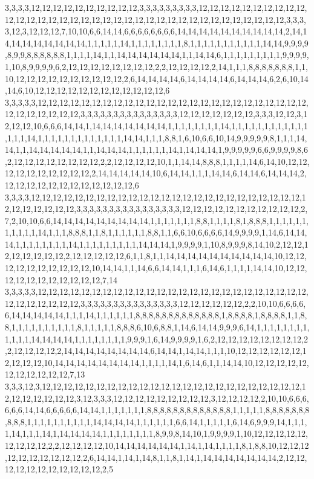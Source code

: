 3,3,3,3,12,12,12,12,12,12,12,12,12,12,3,3,3,3,3,3,3,3,3,12,12,12,12,12,12,12,12,12,12,12,12,12,12,12,12,12,12,12,12,12,12,12,12,12,12,12,12,12,12,12,12,12,12,12,12,3,3,3,3,12,3,12,12,12,7,10,10,6,6,14,14,6,6,6,6,6,6,6,6,14,14,14,14,14,14,14,14,14,14,2,14,14,14,14,14,14,14,14,14,1,1,1,1,1,14,1,1,1,1,1,1,1,1,8,1,1,1,1,1,1,1,1,1,1,1,14,14,9,9,9,9,8,9,9,8,8,8,8,8,8,1,1,1,1,14,1,1,14,14,14,14,14,14,1,1,14,14,6,1,1,1,1,1,1,1,1,1,9,9,9,9,1,10,8,9,9,9,9,6,2,12,12,12,12,12,12,12,12,2,2,12,12,12,12,2,14,1,1,1,8,8,8,8,8,8,8,1,1,10,12,12,12,12,12,12,12,12,12,12,2,6,14,14,14,14,6,14,14,14,14,6,14,14,14,6,2,6,10,14,14,6,10,12,12,12,12,12,12,12,12,12,12,12,12,6
3,3,3,3,3,12,12,12,12,12,12,12,12,12,12,12,12,12,12,12,12,12,12,12,12,12,12,12,12,12,12,12,12,12,12,12,12,3,3,3,3,3,3,3,3,3,3,3,3,3,3,3,12,12,12,12,12,12,12,3,3,3,12,12,3,12,12,12,10,6,6,6,14,14,1,14,14,14,14,14,14,14,1,1,1,1,1,1,1,1,14,1,1,1,1,1,1,1,1,1,1,1,1,1,1,1,14,1,1,1,1,1,1,1,1,1,1,1,1,1,14,14,1,1,1,8,8,1,6,10,6,6,10,14,9,9,9,9,9,8,1,1,1,14,14,1,1,14,14,14,14,14,1,1,14,14,14,1,1,1,1,1,1,14,1,14,14,14,1,9,9,9,9,9,6,6,9,9,9,9,8,6,2,12,12,12,12,12,12,12,12,2,2,12,12,12,12,10,1,1,14,14,8,8,8,1,1,1,1,14,6,14,10,12,12,12,12,12,12,12,12,12,12,2,14,14,14,14,14,10,6,14,14,1,1,1,14,14,6,14,14,6,14,14,14,2,12,12,12,12,12,12,12,12,12,12,12,12,6
3,3,3,3,12,12,12,12,12,12,12,12,12,12,12,12,12,12,12,12,12,12,12,12,12,12,12,12,12,12,12,12,12,12,12,12,3,3,3,3,3,3,3,3,3,3,3,3,3,3,3,3,12,12,12,12,12,12,12,12,12,12,12,2,7,2,10,10,6,6,14,14,14,14,14,14,14,14,14,1,1,1,1,1,1,1,8,8,1,1,1,1,8,1,8,8,8,1,1,1,1,1,1,1,1,1,1,1,14,1,1,1,8,8,8,1,1,8,1,1,1,1,1,1,8,8,1,1,6,6,10,6,6,6,6,14,9,9,9,9,1,14,6,14,14,14,1,1,1,1,1,1,1,1,14,1,1,1,1,1,1,1,1,1,14,14,14,1,9,9,9,9,1,10,8,9,9,9,8,14,10,2,12,12,12,12,12,12,12,12,2,12,12,12,12,12,6,1,1,8,1,1,14,14,14,14,14,14,14,14,14,14,10,12,12,12,12,12,12,12,12,12,12,10,14,14,1,1,14,6,6,14,14,1,1,1,6,14,6,1,1,1,1,14,14,10,12,12,12,12,12,12,12,12,12,12,12,7,14
3,3,3,3,3,12,12,12,12,12,12,12,12,12,12,12,12,12,12,12,12,12,12,12,12,12,12,12,12,12,12,12,12,12,12,12,12,3,3,3,3,3,3,3,3,3,3,3,3,3,3,3,12,12,12,12,12,12,2,2,10,10,6,6,6,6,6,14,14,14,14,14,1,1,1,14,1,1,1,1,1,1,8,8,8,8,8,8,8,8,8,8,8,8,8,1,8,8,8,8,1,8,8,8,8,1,1,8,8,1,1,1,1,1,1,1,1,1,1,8,1,1,1,1,1,8,8,8,6,10,6,8,8,1,14,6,14,14,9,9,9,6,14,1,1,1,1,1,1,1,1,1,1,1,1,14,14,14,14,1,1,1,1,1,1,1,1,9,9,9,1,6,14,9,9,9,9,1,6,2,12,12,12,12,12,12,12,12,2,2,12,12,12,12,2,14,14,14,14,14,14,14,14,6,14,14,1,14,14,1,1,1,10,12,12,12,12,12,12,12,12,12,12,10,14,14,14,14,14,14,14,14,1,1,1,1,14,1,6,14,6,1,1,14,14,10,12,12,12,12,12,12,12,12,12,12,12,7,13
3,3,3,12,3,12,12,12,12,12,12,12,12,12,12,12,12,12,12,12,12,12,12,12,12,12,12,12,12,12,12,12,12,12,12,12,3,12,3,3,3,12,12,12,12,12,12,12,12,12,3,12,12,12,12,2,10,10,6,6,6,6,6,6,14,14,6,6,6,6,6,14,14,1,1,1,1,1,1,1,8,8,8,8,8,8,8,8,8,8,8,8,8,1,1,1,1,1,8,8,8,8,8,8,8,8,8,8,1,1,1,1,1,1,1,1,1,1,14,14,14,14,1,1,1,1,1,1,6,6,14,1,1,1,1,1,6,14,6,9,9,9,14,1,1,1,1,14,1,1,1,14,1,14,14,14,14,1,1,1,1,1,1,1,1,8,9,9,8,14,10,1,9,9,9,9,1,10,12,12,12,12,12,12,12,12,12,2,2,12,12,12,12,10,14,14,14,14,14,14,1,14,1,14,1,1,1,1,8,1,8,8,10,12,12,12,12,12,12,12,12,12,12,2,6,14,14,1,14,1,14,8,1,1,8,1,14,1,14,14,14,14,14,14,14,2,12,12,12,12,12,12,12,12,12,12,12,2,5
